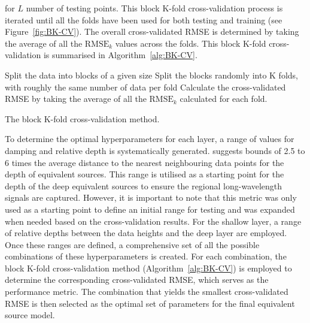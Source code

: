 \noindent
for $L$ number of testing points. This block K-fold cross-validation process is iterated until all the folds have been used for both testing and training (see Figure~\ref{fig:BK-CV}). The overall cross-validated RMSE is determined by taking the average of all the $\text{RMSE}_k$ values across the folds. This block K-fold cross-validation is summarised in Algorithm~\ref{alg:BK-CV}.

\begin{algorithm}[!h]
    Split the data into blocks of a given size
    \;
    Split the blocks randomly into K folds, with roughly the same number of data per fold
    \;
    Calculate the cross-validated RMSE by taking the average of all the $\text{RMSE}_k$ calculated for each fold.
    \BlankLine
    \caption{The block K-fold cross-validation method.}
    \label{alg:BK-CV}
\end{algorithm}

To determine the optimal hyperparameters for each layer, a range of values for damping and relative depth is systematically generated. \citet{Dampney1969} suggests bounds of 2.5 to 6 times the average distance to the nearest neighbouring data points for the depth of equivalent sources. This range is utilised as a starting point for the depth of the deep equivalent sources to ensure the regional long-wavelength signals are captured. However, it is important to note that this metric was only used as a starting point to define an initial range for testing and was expanded when needed based on the cross-validation results. For the shallow layer, a range of relative depths between the data heights and the deep layer are employed. Once these ranges are defined, a comprehensive set of all the possible combinations of these hyperparameters is created. For each combination, the block K-fold cross-validation method (Algorithm~\ref{alg:BK-CV}) is employed to determine the corresponding cross-validated RMSE, which serves as the performance metric. The combination that yields the smallest cross-validated RMSE is then selected as the optimal set of parameters for the final equivalent source model.


